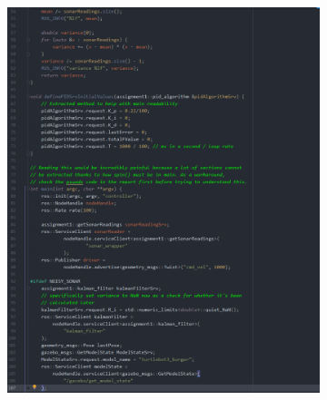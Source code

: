 \documentclass{article}
\begin{document}
\begin{figure}[ht]
\begin{subfigure}{.5\textwidth}
        \includegraphics[scale=0.24]{img/controller2.png}
    \end{subfigure}
\end{figure}
\end{document}
